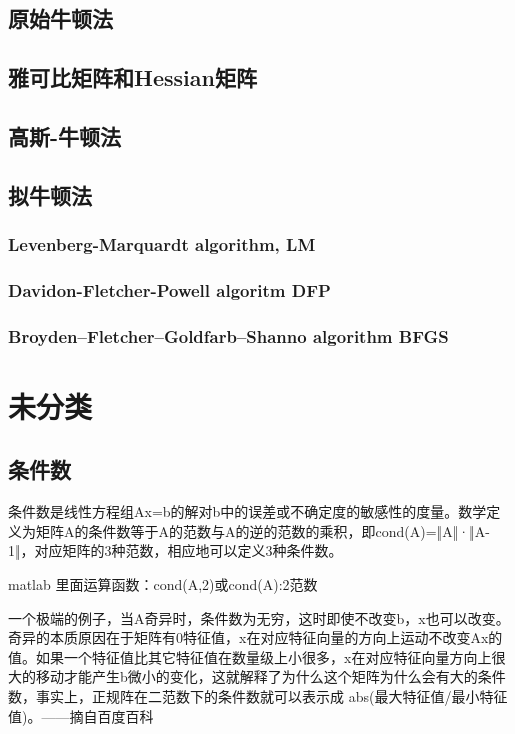 \section{原始牛顿法}\label{MathTools:sec:newton_method}
\section{雅可比矩阵和Hessian矩阵}\label{MathTools:sec:jacobian_hessian}
\section{高斯-牛顿法}\label{MathTools:sec:gauss_newton}
\section{拟牛顿法}\label{MathTools:sec:quasi_newton}
\subsection{Levenberg-Marquardt algorithm, LM}\label{MathTools:sec:lm}
\subsection{Davidon-Fletcher-Powell algoritm DFP}\label{MathTools:sec:dfp}
\subsection{Broyden–Fletcher–Goldfarb–Shanno algorithm BFGS}\label{MathTools:sec:bfgs}

\chapter{未分类}
\section{条件数}
条件数是线性方程组Ax=b的解对b中的误差或不确定度的敏感性的度量。数学定义为矩阵A的条件数等于A的范数与A的逆的范数的乘积，即cond(A)=‖A‖·‖A-1‖，对应矩阵的3种范数，相应地可以定义3种条件数。

matlab 里面运算函数：cond(A,2)或cond(A):2范数

一个极端的例子，当A奇异时，条件数为无穷，这时即使不改变b，x也可以改变。奇异的本质原因在于矩阵有0特征值，x在对应特征向量的方向上运动不改变Ax的值。如果一个特征值比其它特征值在数量级上小很多，x在对应特征向量方向上很大的移动才能产生b微小的变化，这就解释了为什么这个矩阵为什么会有大的条件数，事实上，正规阵在二范数下的条件数就可以表示成 abs(最大特征值/最小特征值)。——摘自百度百科

